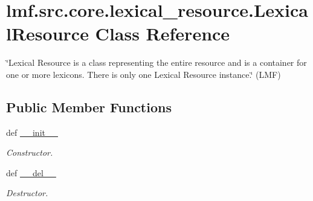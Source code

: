 \hypertarget{classlmf_1_1src_1_1core_1_1lexical__resource_1_1_lexical_resource}{\section{lmf.\+src.\+core.\+lexical\+\_\+resource.\+Lexical\+Resource Class Reference}
\label{classlmf_1_1src_1_1core_1_1lexical__resource_1_1_lexical_resource}
}


\char`\"{}\+Lexical Resource is a class representing the entire resource and is a container for one or more lexicons. There is only one Lexical Resource instance.\char`\"{} (L\+M\+F)  


\subsection*{Public Member Functions}
\begin{DoxyCompactItemize}
\item 
def \hyperlink{classlmf_1_1src_1_1core_1_1lexical__resource_1_1_lexical_resource_a8f7f77cfb5a432a9968844c33e6123a2}{\+\_\+\+\_\+init\+\_\+\+\_\+}
\begin{DoxyCompactList}\small\item\em Constructor. \end{DoxyCompactList}\item 
def \hyperlink{classlmf_1_1src_1_1core_1_1lexical__resource_1_1_lexical_resource_ae39531404208c5fdb20f431d7949568f}{\+\_\+\+\_\+del\+\_\+\+\_\+}
\begin{DoxyCompactList}\small\item\em Destructor. \end{DoxyCompactList}\end{DoxyCompactItemize}
